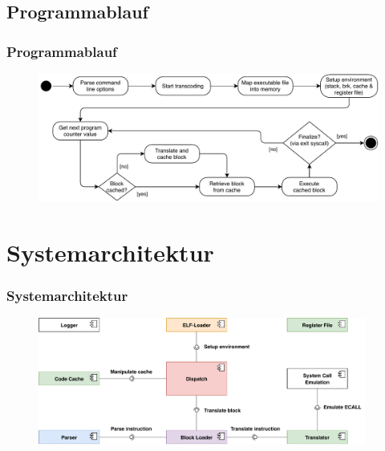 \documentclass[german]{tum-presentation}
\begin{document}
\subsection{Programmablauf}
\begin{frame}
	\frametitle{Programmablauf}
	\begin{figure}
		\includegraphics[width=\textwidth]{diagrams/strategy}
	\end{figure}
\end{frame}

\section{Systemarchitektur}
\begin{frame}
	\frametitle{Systemarchitektur}
	\begin{figure}
		\includegraphics[width=0.96\textwidth]{diagrams/components}
	\end{figure}
\end{frame}
\end{document}
